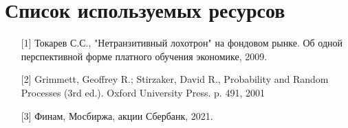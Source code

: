 \chapter{Список используемых ресурсов}

\begin{enumerate}
\item[{[1]}] Токарев С.С., "Нетранзитивный лохотрон" на фондовом рынке. Об одной перспективной форме платного обучения экономике, 2009.
\item[{[2]}] Grimmett, Geoffrey R.; Stirzaker, David R., Probability and Random Processes (3rd ed.). Oxford University Press. p. 491, 2001
\item[{[3]}] Финам, Мосбиржа, акции Сбербанк, 2021.
\end{enumerate}

